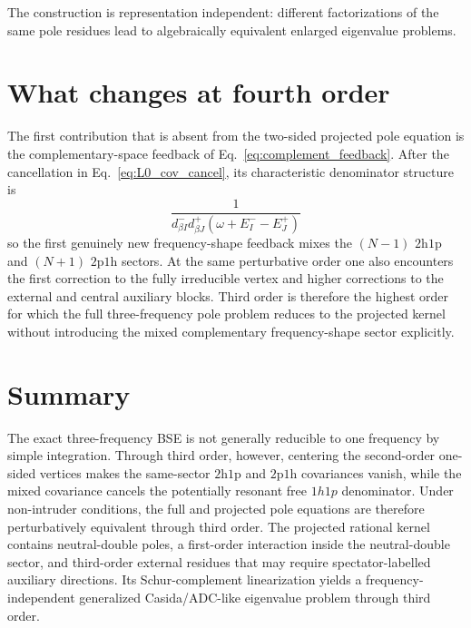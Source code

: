 \documentclass[aip,jcp,reprint,noshowkeys,superscriptaddress]{revtex4-1}
\newcommand{\hhp}{\text{2h1p}}
\newcommand{\pph}{\text{2p1h}}
\begin{document}
The construction is representation independent: different factorizations of the same pole residues lead to algebraically equivalent enlarged eigenvalue problems.

\section{What changes at fourth order}
\label{sec:fourth_order}

The first contribution that is absent from the two-sided projected pole equation is the complementary-space feedback of Eq.~\eqref{eq:complement_feedback}.
After the cancellation in Eq.~\eqref{eq:L0_cov_cancel}, its characteristic denominator structure is
\begin{equation}
	\frac{1}
	{
	d^-_{\beta I}
	d^+_{\beta J}
	(\omega+E^-_I-E^+_J)
	}
	\label{eq:fourth_denominator}
\end{equation}
so the first genuinely new frequency-shape feedback mixes the $(N-1)$ $\hhp$ and $(N+1)$ $\pph$ sectors.
At the same perturbative order one also encounters the first correction to the fully irreducible vertex and higher corrections to the external and central auxiliary blocks.
Third order is therefore the highest order for which the full three-frequency pole problem reduces to the projected kernel without introducing the mixed complementary frequency-shape sector explicitly.

\section{Summary}
\label{sec:summary}

The exact three-frequency BSE is not generally reducible to one frequency by simple integration.
Through third order, however, centering the second-order one-sided vertices makes the same-sector $\hhp$ and $\pph$ covariances vanish, while the mixed covariance cancels the potentially resonant free $1h1p$ denominator.
Under non-intruder conditions, the full and projected pole equations are therefore perturbatively equivalent through third order.
The projected rational kernel contains neutral-double poles, a first-order interaction inside the neutral-double sector, and third-order external residues that may require spectator-labelled auxiliary directions.
Its Schur-complement linearization yields a frequency-independent generalized Casida/ADC-like eigenvalue problem through third order.
\end{document}
